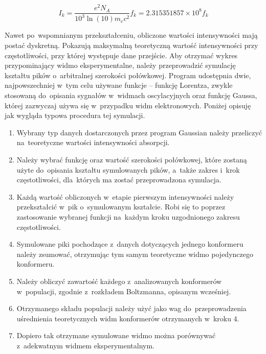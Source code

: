 \begin{equation}\label{eq:oscillator-strength}
  I_k = \frac{e^2 N_A}{10^3 \ln(10) m_e c^2} f_k
      = 2.315351857 \times 10^8 f_k
\end{equation}

Nawet po~wspomnianym przekształceniu, obliczone wartości intensywności mają postać dyskretną.
Pokazują maksymalną teoretyczną wartość intensywności przy częstotliwości, przy której
  występuje dane przejście.
Aby otrzymać wykres przypominający widmo eksperymentalne, należy przeprowadzić symulację
  kształtu pików o~arbitralnej szerokości połówkowej.
Program \tesliper{} udostępnia dwie, najpowszechniej w~tym celu używane funkcje \--- funkcję
  Lorentza, zwykle stosowaną do~opisania sygnałów w~widmach oscylacyjnych oraz funkcję
  Gaussa, której zazwyczaj używa się w~przypadku widm elektronowych.
Poniżej opisuję jak wygląda typowa procedura tej symulacji.

\begin{enumerate}
  \item Wybrany typ danych dostarczonych przez program Gaussian należy przeliczyć na~teoretyczne
  wartości intensywności absorpcji.

  \item Należy wybrać funkcję oraz wartość szerokości połówkowej, które zostaną użyte
  do~opisania kształtu symulowanych pików, a~także zakres i~krok częstotliwości, dla~których
  ma zostać przeprowadzona symulacja.

  \item Każdą wartość obliczonych w~etapie pierwszym intensywności należy przekształcić
  w~pik o~symulowanym kształcie. Robi się to poprzez zastosowanie wybranej funkcji na~każdym
  kroku uzgodnionego zakresu częstotliwości.

  \item Symulowane piki pochodzące z~danych dotyczących jednego konformeru należy zsumować,
  otrzymując tym samym teoretyczne widmo pojedynczego konformeru.

  \item Należy obliczyć zawartość każdego z~analizowanych konformerów w~populacji, zgodnie 
  z~rozkładem Boltzmanna, opisanym wcześniej.

  \item Otrzymanego składu populacji należy użyć jako wag do~przeprowadzenia uśrednienia
  teoretycznych widm konformerów otrzymanych w~kroku 4.

  \item Dopiero tak otrzymane symulowane widmo można porównywać z~adekwatnym widmem
  eksperymentalnym.
\end{enumerate}
